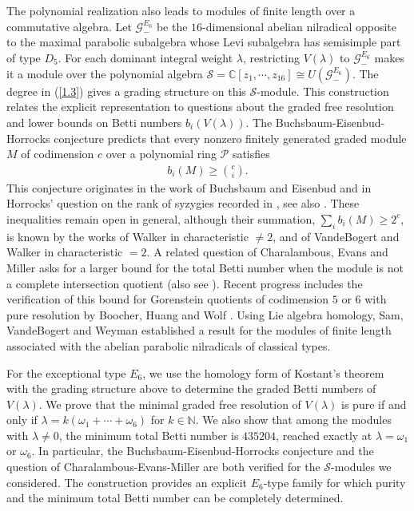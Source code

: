 \documentclass[12pt]{article}
\numberwithin{equation}{section}
\theoremstyle{definition}
\theoremstyle{remark}
\begin{document}
The polynomial realization also leads to modules of finite length over a commutative algebra. Let $\mathscr{G}^{E_6}_-$ be the $16$-dimensional abelian nilradical opposite to the maximal parabolic subalgebra whose Levi subalgebra has semisimple part of type $D_5$. For each dominant integral weight $\lambda$, restricting $V(\lambda)$ to $\mathscr{G}^{E_6}_{-}$ makes it a module over the polynomial algebra $\mathscr{S}=\mathbb{C}[z_1,\cdots,z_{16}]\cong U(\mathscr{G}^{E_6}_-)$. The degree in (\ref{1.3}) gives a grading structure on this $\mathscr{S}$-module. This construction relates the explicit representation to questions about the graded free resolution and lower bounds on Betti numbers $b_i(V(\lambda))$. The Buchsbaum-Eisenbud-Horrocks conjecture predicts that every nonzero finitely generated graded module $M$ of codimension $c$ over a polynomial ring $\mathscr{P}$ satisfies
\begin{eqnarray}
	b_i(M)\geqslant\binom{c}{i}.
\end{eqnarray}
This conjecture originates in the work of  Buchsbaum and Eisenbud \cite{BE} and in Horrocks' question on the rank of syzygies recorded in \cite{Ha}, see also \cite[Conjecture 4.1]{BG}. These inequalities remain open in general, although their summation, $\sum_i b_i(M)\geqslant 2^c$, is known by the works of Walker \cite{W} in characteristic $\neq2$, and of VandeBogert and Walker \cite{VW} in characteristic $=2$. A related question of Charalambous, Evans and Miller \cite{CEM} asks for a larger bound for the total Betti number when the module is not a complete intersection quotient (also see \cite[Question B]{BG}). Recent progress includes the verification of this bound for Gorenstein quotients of codimension $5$ or $6$ with pure resolution by Boocher, Huang and Wolf \cite{BHW}. Using Lie algebra homology, Sam, VandeBogert and Weyman \cite{SVW} established a result for the modules of finite length associated with the abelian parabolic nilradicals  of classical types. 

For the exceptional type $E_6$, we use the homology form of Kostant's theorem \cite{K} with the grading structure above to determine the graded Betti numbers of $V(\lambda)$. We prove that the minimal graded free resolution of $V(\lambda)$ is pure if and only if $\lambda=k(\omega_1+\cdots+\omega_6)$ for $k\in\mathbb{N}$. We also show that among the modules with $\lambda\neq0$, the minimum total Betti number is $435204$, reached exactly at $\lambda=\omega_1$ or $\omega_6$. In particular, the Buchsbaum-Eisenbud-Horrocks conjecture and the question of Charalambous-Evans-Miller are both verified for the $\mathscr{S}$-modules we considered. The construction provides an explicit $E_6$-type family for which purity and the minimum total Betti number can be completely determined.
\end{document}
